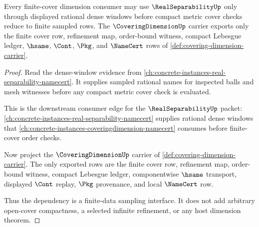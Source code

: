 \begin{theorem}
\label{thm:covering-dimension-real-separability-sampling}
Every finite-cover dimension consumer may use $\RealSeparabilityUp$ only through displayed rational dense windows before compact metric cover checks reduce to finite sampled rows. The $\CoveringDimensionUp$ carrier exports only the finite cover row, refinement map, order-bound witness, compact Lebesgue ledger, $\hsame$, $\Cont$, $\Pkg$, and $\NameCert$ rows of \autoref{def:covering-dimension-carrier}.
\end{theorem}
\begin{proof}
Read the dense-window evidence from \autoref{ch:concrete-instances-real-separability-namecert}. It supplies sampled rational names for inspected balls and mesh witnesses before any compact metric cover check is evaluated.

This is the downstream consumer edge for the $\RealSeparabilityUp$ packet: \autoref{ch:concrete-instances-real-separability-namecert} supplies rational dense windows that \autoref{ch:concrete-instances-coveringdimension-namecert} consumes before finite-cover order checks.

Now project the $\CoveringDimensionUp$ carrier of \autoref{def:covering-dimension-carrier}. The only exported rows are the finite cover row, refinement map, order-bound witness, compact Lebesgue ledger, componentwise $\hsame$ transport, displayed $\Cont$ replay, $\Pkg$ provenance, and local $\NameCert$ row.

Thus the dependency is a finite-data sampling interface. It does not add arbitrary open-cover compactness, a selected infinite refinement, or any host dimension theorem.
\end{proof}

